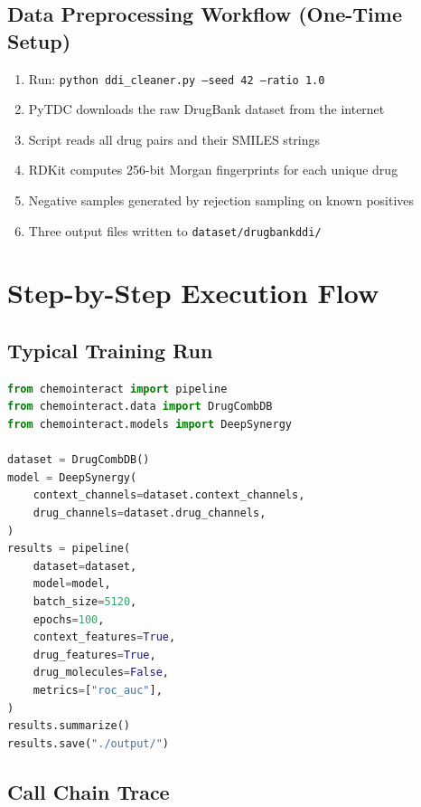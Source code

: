 \documentclass[12pt,a4paper,oneside]{book}
\begin{document}
\section{Data Preprocessing Workflow (One-Time Setup)}
\begin{enumerate}
  \item Run: \texttt{python ddi\_cleaner.py --seed 42 --ratio 1.0}
  \item PyTDC downloads the raw DrugBank dataset from the internet
  \item Script reads all drug pairs and their SMILES strings
  \item RDKit computes 256-bit Morgan fingerprints for each unique drug
  \item Negative samples generated by rejection sampling on known positives
  \item Three output files written to \texttt{dataset/drugbankddi/}
\end{enumerate}

\chapter{Step-by-Step Execution Flow}\label{chap:execution}

\section{Typical Training Run}

\begin{lstlisting}[language=Python]
from chemointeract import pipeline
from chemointeract.data import DrugCombDB
from chemointeract.models import DeepSynergy

dataset = DrugCombDB()
model = DeepSynergy(
    context_channels=dataset.context_channels,
    drug_channels=dataset.drug_channels,
)
results = pipeline(
    dataset=dataset,
    model=model,
    batch_size=5120,
    epochs=100,
    context_features=True,
    drug_features=True,
    drug_molecules=False,
    metrics=["roc_auc"],
)
results.summarize()
results.save("./output/")
\end{lstlisting}

\section{Call Chain Trace}
\end{document}
